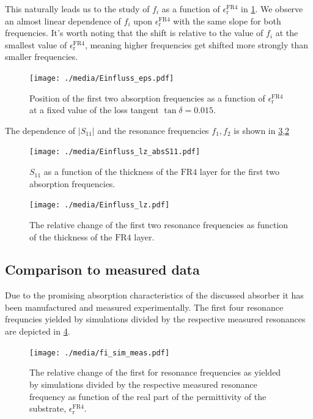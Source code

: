 This naturally leads us to the study of $f_i$ as a function of $\epsilon_\mathrm{r}^\text{FR4}$ in \cref{fig:fi_epsr}. We observe an almost linear dependence of $f_i$ upon $\epsilon_\mathrm{r}^\text{FR4}$ with the same slope for both frequencies. It's worth noting that the shift is relative to the value of $f_i$ at the smallest value of $\epsilon_\mathrm{r}^\text{FR4}$, meaning higher frequencies get shifted more strongly than smaller frequencies. 

\begin{figure}
\centering
\texttt{[image: ./media/Einfluss\_eps.pdf]}
\caption{Position of the first two absorption frequencies as a function of $\epsilon_\mathrm{r}^\text{FR4}$ at a fixed value of the loss tangent $\tan\delta=0.015$.}
\label{fig:fi_epsr}
\end{figure}

The dependence of $|S_{11}|$ and the resonance frequencies $f_1, f_2$ is shown in \cref{fig:lz_fi},\cref{fig:lz_absS11}

\begin{figure}
\centering
\texttt{[image: ./media/Einfluss\_lz\_absS11.pdf]}
\caption{$S_{11}$ as a function of the thickness of the $\mathrm{FR4}$ layer for the first two absorption frequencies.}
\label{fig:lz_absS11}
\end{figure}
\begin{figure}
\centering
\texttt{[image: ./media/Einfluss\_lz.pdf]}
\caption{The relative change of the first two resonance frequencies as function of the thickness of the $\mathrm{FR4}$ layer.}
\label{fig:lz_fi}
\end{figure}

\subsection{Comparison to measured data}
Due to the promising absorption characteristics of the discussed absorber it has been manufactured and measured experimentally. The first four resonance frequncies yielded by simulations divided by the respective measured resonances are depicted in \cref{fig:sim_meas_vgl}.
\begin{figure}
\centering
\texttt{[image: ./media/fi\_sim\_meas.pdf]}
\caption{The relative change of the first for resonance frequencies as yielded by simulations divided by the respective measured resonance frequency as function of the real part of the permittivity of the substrate, $\epsilon_\mathrm{r}^\mathrm{FR4}$.}
\label{fig:sim_meas_vgl}
\end{figure}
